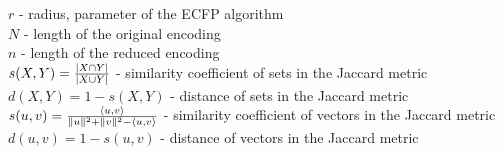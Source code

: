 \( r \) - radius, parameter of the ECFP algorithm \\

\vspace{-0.8em}\noindent
\( N \) - length of the original encoding \\

\vspace{-0.8em}\noindent
\( n \) - length of the reduced encoding \\

\vspace{-0.8em}\noindent
\( s(X,Y) = \frac{\left| X \cap Y \right|}{\left| X \cup Y \right|} \) - similarity coefficient of sets in the Jaccard metric \cite{levy2024similarities} \\

\vspace{-0.8em}\noindent
\( d(X,Y) = 1 - s(X,Y) \) - distance of sets in the Jaccard metric \\

\vspace{-0.8em}\noindent
\( s(u,v) = \frac{\left\langle u,v \right\rangle}{\| u \|^2 + \| v \|^2 - \left\langle u,v \right\rangle} \) - similarity coefficient of vectors in the Jaccard metric \cite{levy2024similarities}
\\

\vspace{-0.8em}\noindent
\( d(u,v) = 1 - s(u,v) \) - distance of vectors in the Jaccard metric